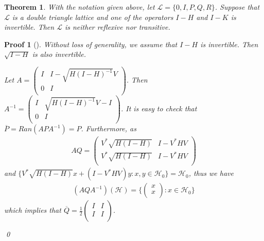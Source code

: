 \documentclass{jaums}
\theoremstyle{thmit} %
\newtheorem{theorem}{Theorem}[section]
\theoremstyle{thmrm} %
\newtheorem*{oldproof}{Proof}
\renewenvironment{proof}[1][{}]{\begin{oldproof}[#1]}{\qed\end{oldproof}}
\begin{document}
 \begin{theorem} With the notation given above, let $\mathcal{L}=\{0,I,P,Q,R\}$.
Suppose that
 $\mathcal{L}$ is a double triangle lattice and one of the operators $I-H$ and
$I-K$ is invertible. Then $\mathcal{L}$ is neither reflexive nor transitive.
 \end{theorem}

 \begin{proof} Without loss of generality, we assume that $I-H$ is invertible.
Then $\sqrt{I-H}$ is also invertible.

        Let $A=\left(
          \begin{array}{cc}
            I & I-\sqrt{H(I-H)^{-1}}V \\
            0 & I \\
          \end{array}
        \right)$. Then $A^{-1}=\left(
          \begin{array}{cc}
            I & \sqrt{H(I-H)^{-1}}V-I \\
            0 & I \\
          \end{array}
        \right)$.
It is easy to check that $\overline{P}=Ran(APA^{-1})=P$. Furthermore, as
\begin{align*} AQ=\left(
          \begin{array}{cc}
            V^*\sqrt{H(I-H)} & I-V^*HV \\
            V^*\sqrt{H(I-H)} & I-V^*HV \\
          \end{array}
        \right)
\end{align*} and
$\{V^*\sqrt{H(I-H)}x+(I-V^*HV)y:x,y\in\mathcal{H}_0\}=\mathcal{H}_0$, thus we
have
              \begin{align*}(AQA^{-1})(\mathcal{H})=\{\left(
                                                   \begin{array}{c}
                                                     x \\
                                                     x \\
                                                   \end{array}
                                                 \right):x\in\mathcal{H}_0\}
        \end{align*} which implies that $\overline{Q}=\frac{1}{2}\left(
          \begin{array}{cc}
            I & I \\
            I & I \\
          \end{array}
        \right)$.


\end{proof}
\end{document}

